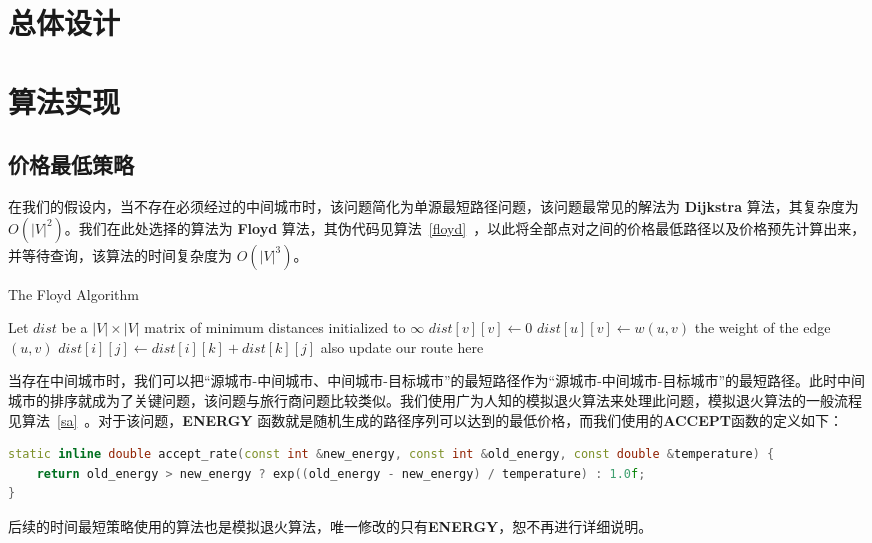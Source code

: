 \documentclass[lang=cn,blue]{elegantbook}
\begin{document}
\chapter{总体设计}

\chapter{算法实现}

\section{价格最低策略}

在我们的假设内，当不存在必须经过的中间城市时，该问题简化为单源最短路径问题，该问题最常见的解法为 \textbf{Dijkstra} 算法，其复杂度为 $O(|V|^2)$。我们在此处选择的算法为 \textbf{Floyd} 算法，其伪代码见算法~\ref{floyd}~，以此将全部点对之间的价格最低路径以及价格预先计算出来，并等待查询，该算法的时间复杂度为 $O(|V|^3)$。

\begin{algorithm}[H]
	\caption{\label{floyd}The Floyd Algorithm}
	\begin{algorithmic}[1]
		\State Let $dist$ be a $|V| \times |V|$ matrix of minimum distances initialized to $\infty$
		\State $dist[v][v]\gets 0$
		\EndFor
		\State $dist[u][v]\gets w(u,v)$ \Comment the weight of the edge $(u,v)$
		\EndFor
		\State $dist[i][j] \gets dist[i][k] + dist[k][j]$
		\Comment also update our route here
		\EndIf
		\EndFor
		\EndFor
		\EndFor
		\EndProcedure
	\end{algorithmic}
\end{algorithm}

当存在中间城市时，我们可以把``源城市-中间城市、中间城市-目标城市''的最短路径作为``源城市-中间城市-目标城市''的最短路径。此时中间城市的排序就成为了关键问题，该问题与旅行商问题比较类似。我们使用广为人知的模拟退火算法来处理此问题，模拟退火算法的一般流程见算法~\ref{sa}~。对于该问题，\textbf{ENERGY} 函数就是随机生成的路径序列可以达到的最低价格，而我们使用的\textbf{ACCEPT}函数的定义如下：
\begin{lstlisting}[language=C++]
static inline double accept_rate(const int &new_energy, const int &old_energy, const double &temperature) {
	return old_energy > new_energy ? exp((old_energy - new_energy) / temperature) : 1.0f;
}
\end{lstlisting}
后续的时间最短策略使用的算法也是模拟退火算法，唯一修改的只有\textbf{ENERGY}，恕不再进行详细说明。
\end{document}
